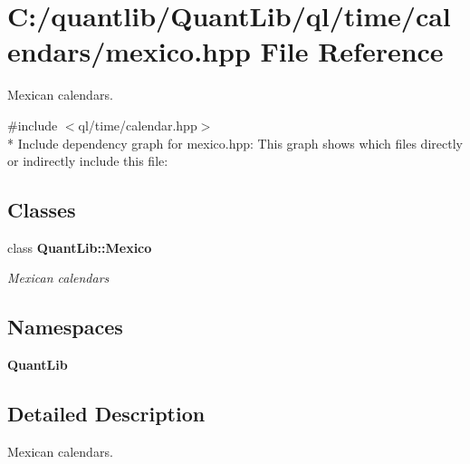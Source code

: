 \section{C\+:/quantlib/\+Quant\+Lib/ql/time/calendars/mexico.hpp File Reference}
\label{mexico_8hpp}


Mexican calendars.  


{\ttfamily \#include $<$ql/time/calendar.\+hpp$>$}\\*
Include dependency graph for mexico.\+hpp\+:
This graph shows which files directly or indirectly include this file\+:
\subsection*{Classes}
\begin{DoxyCompactItemize}
\item 
class {\bf Quant\+Lib\+::\+Mexico}
\begin{DoxyCompactList}\small\item\em Mexican calendars \end{DoxyCompactList}\end{DoxyCompactItemize}
\subsection*{Namespaces}
\begin{DoxyCompactItemize}
\item 
 {\bf Quant\+Lib}
\end{DoxyCompactItemize}


\subsection{Detailed Description}
Mexican calendars. 

